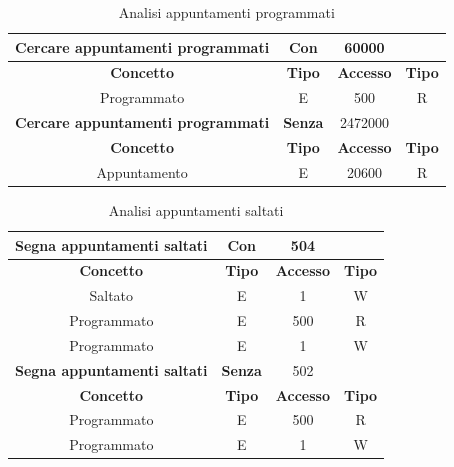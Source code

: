 \documentclass[11pt]{article}
\begin{document}
\begin{table}[H]
\begin{tabular}{|c|c|c|c|}
\hline \textbf{Cercare appuntamenti programmati} & \textbf{Con}   & \textbf{60000}   &               \\
\hline \textbf{Concetto}                         & \textbf{Tipo}  & \textbf{Accesso} & \textbf{Tipo} \\
\hline Programmato                               & E              & 500              & R             \\
\hline \textbf{Cercare appuntamenti programmati} & \textbf{Senza} & 2472000          &               \\
\hline \textbf{Concetto}                         & \textbf{Tipo}  & \textbf{Accesso} & \textbf{Tipo} \\
\hline Appuntamento                              & E              & 20600            & R             \\
\hline
\end{tabular}
    \caption{Analisi appuntamenti programmati}
    \label{tab:programmati}
\end{table}

\begin{table}[H]
\begin{tabular}{|c|c|c|c|}
\hline \textbf{Segna appuntamenti saltati} & \textbf{Con}   & \textbf{504}     &               \\
\hline \textbf{Concetto}                   & \textbf{Tipo}  & \textbf{Accesso} & \textbf{Tipo} \\
\hline Saltato                             & E              & 1                & W             \\
\hline Programmato                         & E              & 500              & R             \\
\hline Programmato                         & E              & 1                & W             \\
\hline \textbf{Segna appuntamenti saltati} & \textbf{Senza} & 502              &               \\
\hline \textbf{Concetto}                   & \textbf{Tipo}  & \textbf{Accesso} & \textbf{Tipo} \\
\hline Programmato                         & E              & 500              & R             \\
\hline Programmato                         & E              & 1                & W             \\
\hline
\end{tabular}
    \caption{Analisi appuntamenti saltati}
    \label{tab:saltati}
\end{table}
\end{document}
